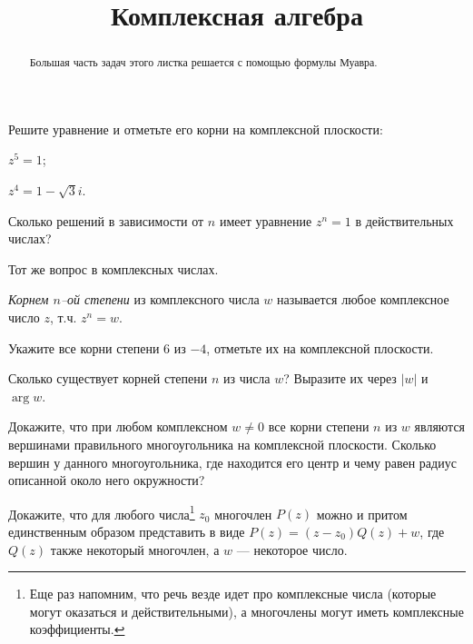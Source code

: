 \documentclass[a4paper, 12pt, num=22, date=16.09.2019]{listok}
\begin{document}
\title{Комплексная алгебра}
\maketitle{}
\begin{abstract}
	Большая часть задач этого листка решается с помощью формулы Муавра.
\end{abstract}
\begin{problem}
	Решите уравнение и отметьте его корни на комплексной плоскости:
	\begin{multienum}{2}
		\item $z^5 = 1$;
		\item $z^4 = 1 - \sqrt3i$.
	\end{multienum}
\end{problem}
\begin{problem}
\begin{probparts}
	\item Сколько решений в зависимости от $n$ имеет уравнение $z^n = 1$ в действительных числах?
	\item Тот же вопрос в комплексных числах.
\end{probparts}
\end{problem}
\begin{definition}
	\textit{Корнем $n$--ой степени} из комплексного числа $w$ называется любое комплексное число $z$, т.ч. $z^n = w$.
\end{definition}
\begin{problem}
	Укажите все корни степени $6$ из $-4$, отметьте их на комплексной плоскости.
\end{problem}
\begin{problem}
	Сколько существует корней степени $n$ из числа $w$? Выразите их через $|w|$ и $\arg w$.
\end{problem}
\begin{problem}
	Докажите, что при любом комплексном $w \ne 0$ все корни степени $n$ из $w$ являются
	вершинами правильного многоугольника на комплексной плоскости.
	Сколько вершин у данного многоугольника,
	где находится его центр и чему равен радиус описанной около него окружности?
\end{problem}
\begin{problem}
	Докажите, что для любого числа\footnote{Еще раз напомним, что речь везде идет про комплексные числа
	(которые могут оказаться и действительными), а многочлены могут иметь комплексные коэффициенты.}
	$z_0$ многочлен $P(z)$ можно и притом единственным образом представить в виде $P(z) = (z - z_0)Q(z) + w$,
	где $Q(z)$ также некоторый многочлен, а $w$ --- некоторое число.
\end{problem}
\end{document}
